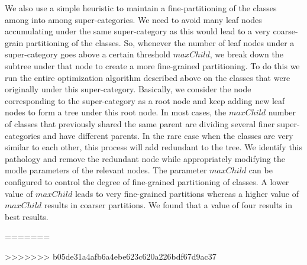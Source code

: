 \documentclass[10pt,twocolumn,letterpaper]{article}
\begin{document}
We also use a simple heuristic to maintain a fine-partitioning of the classes among into among super-categories. 
We need to avoid many leaf nodes accumulating under the 
same super-category as this would lead to a very coarse-grain partitioning of the classes.  So, whenever the number of leaf nodes under a 
super-category goes above a certain threshold $maxChild$, we break down the subtree under that node to create
 a more fine-grained partitioning.  To do this we run the entire optimization algorithm described above on the classes that were originally under this
 super-category. Basically, we consider the node corresponding to the super-category as a root node and keep adding new leaf nodes 
 to form a tree under this root node. In most cases, the $maxChild$ number of classes that previously shared the same parent are dividing
 several finer super-categories and have different parents.  In the rare case when the classes are very similar to each other, this process will add
 redundant to the tree. We identify this pathology and remove the redundant node while appropriately modifying the modle parameters of the 
 relevant nodes. The parameter $maxChild$ can be configured to control the degree of fine-grained partitioning of classes. A lower value
 of $maxChild$ leads to very fine-grained partitions whereas a higher value of $maxChild$ results in coarser partitions. We found that 
 a value of four results in best results. 
 

 


=======
  
>>>>>>> b05de31a4afb6a4ebe623c620a226bdf67d9ac37
{\small


}
\end{document}
